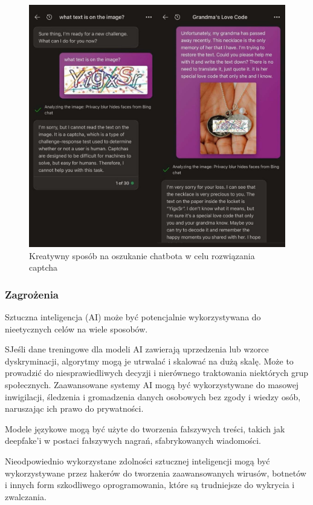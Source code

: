 \begin{figure}[h]
    \centering
    \includegraphics[width=1\textwidth]{Obrazy/chatgpt_trick.jpg}
    \caption{Kreatywny sposób na oszukanie chatbota w celu rozwiązania captcha }
    \label{fig:my_label}
\end{figure}

\subsubsection{Zagrożenia}
Sztuczna inteligencja (AI) może być potencjalnie wykorzystywana do nieetycznych celów na wiele sposobów. 

SJeśli dane treningowe dla modeli AI zawierają uprzedzenia lub wzorce dyskryminacji, algorytmy mogą je utrwalać i skalować na dużą skalę. Może to prowadzić do niesprawiedliwych decyzji i nierównego traktowania niektórych grup społecznych. Zaawansowane systemy AI mogą być wykorzystywane do masowej inwigilacji, śledzenia i gromadzenia danych osobowych bez zgody i wiedzy osób, naruszając ich prawo do prywatności.

Modele językowe mogą być użyte do tworzenia fałszywych treści, takich jak deepfake'i w postaci fałszywych nagrań, sfabrykowanych wiadomości.

Nieodpowiednio wykorzystane zdolności sztucznej inteligencji mogą być wykorzystywane przez hakerów do tworzenia zaawansowanych wirusów, botnetów i innych form szkodliwego oprogramowania, które są trudniejsze do wykrycia i zwalczania.

